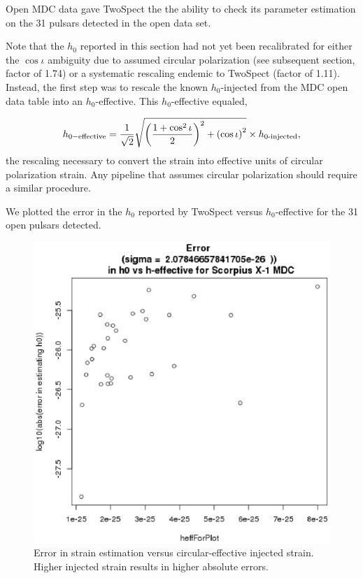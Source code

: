Open MDC data gave TwoSpect the the ability to check its parameter estimation on the 31 pulsars detected in the open data set.

Note that the $h_0$ reported in this section had not yet been recalibrated for either the $\cos \iota$ ambiguity due to assumed circular polarization (see subsequent section, factor of 1.74) or a systematic rescaling endemic to TwoSpect (factor of 1.11). 
Instead, the first step was to rescale the known $h_0$-injected from the MDC open data table into an $h_0$-effective. 
This $h_0$-effective equaled,

\begin{equation} h_{0-\textup{effective}} = \frac{1}{\sqrt{2}}\sqrt{ \left(\frac{1+\cos^2 \iota}{2}\right)^2 + \left(\cos \iota\right)^2 } \times h_{0\textup{-injected}},
\end{equation}
\noindent the rescaling necessary to convert the strain into effective units of circular polarization strain. 
Any pipeline that assumes circular polarization should require a similar procedure.

We plotted the error in the $h_0$ reported by TwoSpect versus $h_0$-effective for the 31 open pulsars detected.

\begin{figure}
\begin{center}
\includegraphics[width=0.5\paperwidth,height=0.35\paperheight]{detectedHerrVsHeffective.eps}
\caption{ Error in strain estimation versus circular-effective injected strain. Higher injected strain results in higher absolute errors.
\label{fig:detectedherrvsheffective}} 
\end{center}
\end{figure}


